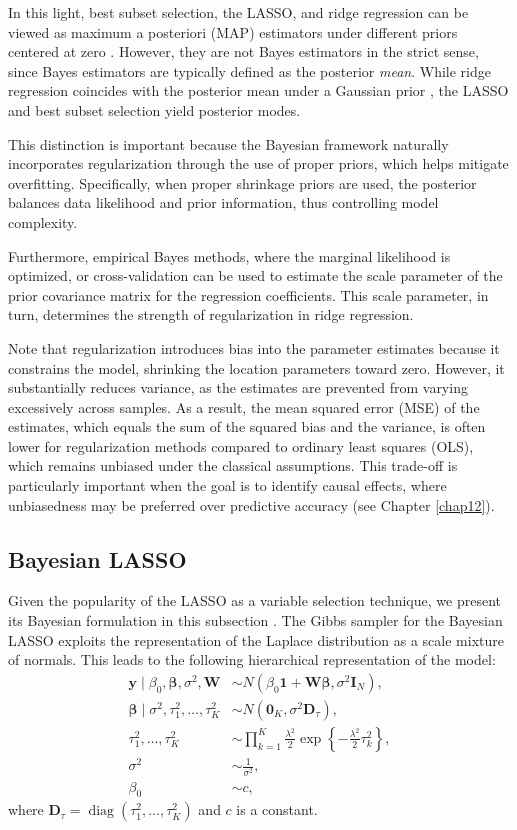 In this light, best subset selection, the LASSO, and ridge regression can be viewed as maximum a posteriori (MAP) estimators under different priors centered at zero \cite{Park2008}. However, they are not Bayes estimators in the strict sense, since Bayes estimators are typically defined as the posterior \textit{mean}. While ridge regression coincides with the posterior mean under a Gaussian prior \cite{Ishwaran2005}, the LASSO and best subset selection yield posterior modes.

This distinction is important because the Bayesian framework naturally incorporates regularization through the use of proper priors, which helps mitigate overfitting. Specifically, when proper shrinkage priors are used, the posterior balances data likelihood and prior information, thus controlling model complexity.

Furthermore, empirical Bayes methods, where the marginal likelihood is optimized, or cross-validation can be used to estimate the scale parameter of the prior covariance matrix for the regression coefficients. This scale parameter, in turn, determines the strength of regularization in ridge regression.

Note that regularization introduces bias into the parameter estimates because it constrains the model, shrinking the location parameters toward zero. However, it substantially reduces variance, as the estimates are prevented from varying excessively across samples. As a result, the mean squared error (MSE) of the estimates, which equals the sum of the squared bias and the variance, is often lower for regularization methods compared to ordinary least squares (OLS), which remains unbiased under the classical assumptions. This trade-off is particularly important when the goal is to identify causal effects, where unbiasedness may be preferred over predictive accuracy (see Chapter \ref{chap12}).

\subsection{Bayesian LASSO}\label{sec13_21}
Given the popularity of the LASSO as a variable selection technique, we present its Bayesian formulation in this subsection \cite{Park2008}. The Gibbs sampler for the Bayesian LASSO exploits the representation of the Laplace distribution as a scale mixture of normals. This leads to the following hierarchical representation of the model:
\begin{align*}
	\mathbf{y} \mid \beta_0, \boldsymbol{\beta}, \sigma^2, \mathbf{W} &\sim {N}(\beta_0 \mathbf{1} + \mathbf{W} \boldsymbol{\beta}, \sigma^2 \mathbf{I}_N), \\
	\boldsymbol{\beta} \mid \sigma^2, \tau_1^2, \dots, \tau_K^2 &\sim {N}(\mathbf{0}_K, \sigma^2 \mathbf{D}_{\tau}), \\
	\tau_1^2, \dots, \tau_K^2 &\sim \prod_{k=1}^K \frac{\lambda^2}{2} \exp\left\{ -\frac{\lambda^2}{2} \tau_k^2 \right\}, \\
	\sigma^2 &\sim \frac{1}{\sigma^2},\\
	\beta_0&\sim c,
\end{align*}
where $\mathbf{D}_{\tau} = \operatorname{diag}(\tau_1^2, \dots, \tau_K^2)$ and $c$ is a constant. 

